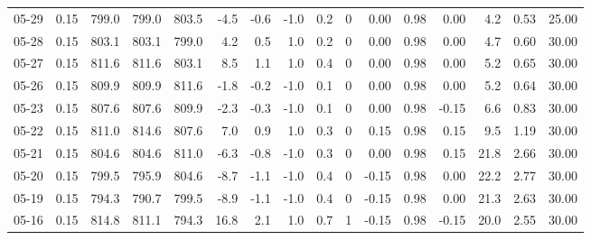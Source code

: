 \begin{threeparttable}
{\begin{tabular}{lrrrrrrrrrrrrrrr}
  05-29 &     0.15 & 799.0 & 799.0 & 803.5 &       -4.5 &           -0.6 &                     -1.0 &                 0.2 &              0 &       0.00 &      0.98 &           0.00 &              4.2 &            0.53 &                  25.00 \\
  05-28 &     0.15 & 803.1 & 803.1 & 799.0 &        4.2 &            0.5 &                      1.0 &                 0.2 &              0 &       0.00 &      0.98 &           0.00 &              4.7 &            0.60 &                  30.00 \\
  05-27 &     0.15 & 811.6 & 811.6 & 803.1 &        8.5 &            1.1 &                      1.0 &                 0.4 &              0 &       0.00 &      0.98 &           0.00 &              5.2 &            0.65 &                  30.00 \\
  05-26 &     0.15 & 809.9 & 809.9 & 811.6 &       -1.8 &           -0.2 &                     -1.0 &                 0.1 &              0 &       0.00 &      0.98 &           0.00 &              5.2 &            0.64 &                  30.00 \\
  05-23 &     0.15 & 807.6 & 807.6 & 809.9 &       -2.3 &           -0.3 &                     -1.0 &                 0.1 &              0 &       0.00 &      0.98 &          -0.15 &              6.6 &            0.83 &                  30.00 \\
  05-22 &     0.15 & 811.0 & 814.6 & 807.6 &        7.0 &            0.9 &                      1.0 &                 0.3 &              0 &       0.15 &      0.98 &           0.15 &              9.5 &            1.19 &                  30.00 \\
  05-21 &     0.15 & 804.6 & 804.6 & 811.0 &       -6.3 &           -0.8 &                     -1.0 &                 0.3 &              0 &       0.00 &      0.98 &           0.15 &             21.8 &            2.66 &                  30.00 \\
  05-20 &     0.15 & 799.5 & 795.9 & 804.6 &       -8.7 &           -1.1 &                     -1.0 &                 0.4 &              0 &      -0.15 &      0.98 &           0.00 &             22.2 &            2.77 &                  30.00 \\
  05-19 &     0.15 & 794.3 & 790.7 & 799.5 &       -8.9 &           -1.1 &                     -1.0 &                 0.4 &              0 &      -0.15 &      0.98 &           0.00 &             21.3 &            2.63 &                  30.00 \\
  05-16 &     0.15 & 814.8 & 811.1 & 794.3 &       16.8 &            2.1 &                      1.0 &                 0.7 &              1 &      -0.15 &      0.98 &          -0.15 &             20.0 &            2.55 &                  30.00 \\

\end{tabular}}
\end{threeparttable}
